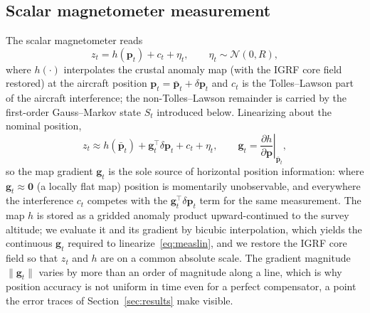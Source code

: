 \documentclass{IEEEtaes}
\begin{document}
\subsection{Scalar magnetometer measurement}
The scalar magnetometer reads
\begin{equation}
z_t = h(\mathbf{p}_t) + c_t + \eta_t, \qquad \eta_t\sim\mathcal{N}(0,R),
\label{eq:meas}
\end{equation}
where $h(\cdot)$ interpolates the crustal anomaly map (with the IGRF core field
restored) at the aircraft position $\mathbf{p}_t=\bar{\mathbf{p}}_t+\delta\mathbf{p}_t$
and $c_t$ is the Tolles--Lawson part of the aircraft interference; the
non-Tolles--Lawson remainder is carried by the first-order Gauss--Markov state
$S_t$ introduced below. Linearizing about the nominal position,
\begin{equation}
z_t \approx h(\bar{\mathbf{p}}_t)+\mathbf{g}_t^{\top}\delta\mathbf{p}_t+c_t+\eta_t,
\qquad \mathbf{g}_t=\left.\frac{\partial h}{\partial\mathbf{p}}\right|_{\bar{\mathbf{p}}_t},
\label{eq:measlin}
\end{equation}
so the map gradient $\mathbf{g}_t$ is the sole source of horizontal position
information: where $\mathbf{g}_t\!\approx\!\mathbf{0}$ (a locally flat map) position
is momentarily unobservable, and everywhere the interference $c_t$ competes with the
$\mathbf{g}_t^{\top}\delta\mathbf{p}_t$ term for the same measurement. The map $h$ is
stored as a gridded anomaly product upward-continued to the survey altitude; we
evaluate it and its gradient by bicubic interpolation, which yields the continuous
$\mathbf{g}_t$ required to linearize~\eqref{eq:measlin}, and we restore the IGRF core
field so that $z_t$ and $h$ are on a common absolute scale. The gradient magnitude
$\lVert\mathbf{g}_t\rVert$ varies by more than an order of magnitude along a line,
which is why position accuracy is not uniform in time even for a perfect
compensator, a point the error traces of Section~\ref{sec:results} make visible.
\end{document}
